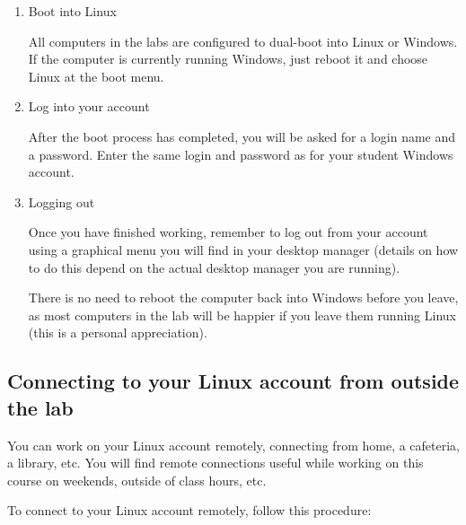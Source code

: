 \documentclass[a4paper, 12pt]{article}
\begin{document}
  \begin{enumerate}

    \item Boot into Linux

      All computers in the labs are configured to
      dual-boot into Linux or Windows. If the computer is currently running
      Windows, just reboot it and choose Linux at the boot menu.

    \item Log into your account

      After the boot process has completed, you
      will be asked for a login name and a password. Enter the same login and
      password as for your student Windows account.

    \item Logging out

      Once you have finished working, remember to log out from
      your account using a graphical menu you will find in your desktop manager
      (details on how to do this depend on the actual desktop manager you are
      running).

      There is no need to reboot the computer back into Windows
      before you leave, as most computers in the lab will be happier if you
      leave them running Linux (this is a personal appreciation).

  \end{enumerate}

\subsection{Connecting to your Linux account from outside the lab}

  You can work on your Linux account remotely, connecting from home, a
  cafeteria, a library, etc.  You will find remote connections useful while
  working on this course on weekends, outside of class hours, etc.

  To connect to your Linux account remotely, follow this procedure:
\end{document}
